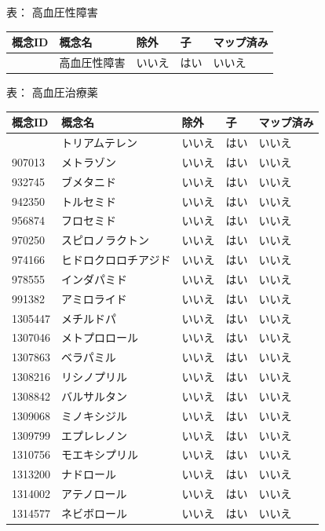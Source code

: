 \documentclass[
  11pt]{book}
\theoremstyle{definition}
\theoremstyle{definition}
\theoremstyle{definition}
\theoremstyle{definition}
\theoremstyle{remark}
\begin{document}
表：\label{tab:hypertensionThzMono} 高血圧性障害

\begin{longtable}[]{@{}lllll@{}}
\toprule\noalign{}
概念ID & 概念名 & 除外 & 子 & マップ済み \\
\midrule\noalign{}
\endhead
\bottomrule\noalign{}
\endlastfoot
316866 & 高血圧性障害 & いいえ & はい & いいえ \\
\end{longtable}

表：\label{tab:htnDrugsThzMono} 高血圧治療薬

\begin{longtable}[]{@{}lllll@{}}
\toprule\noalign{}
概念ID & 概念名 & 除外 & 子 & マップ済み \\
\midrule\noalign{}
\endhead
\bottomrule\noalign{}
\endlastfoot
904542 & トリアムテレン & いいえ & はい & いいえ \\
907013 & メトラゾン & いいえ & はい & いいえ \\
932745 & ブメタニド & いいえ & はい & いいえ \\
942350 & トルセミド & いいえ & はい & いいえ \\
956874 & フロセミド & いいえ & はい & いいえ \\
970250 & スピロノラクトン & いいえ & はい & いいえ \\
974166 & ヒドロクロロチアジド & いいえ & はい & いいえ \\
978555 & インダパミド & いいえ & はい & いいえ \\
991382 & アミロライド & いいえ & はい & いいえ \\
1305447 & メチルドパ & いいえ & はい & いいえ \\
1307046 & メトプロロール & いいえ & はい & いいえ \\
1307863 & ベラパミル & いいえ & はい & いいえ \\
1308216 & リシノプリル & いいえ & はい & いいえ \\
1308842 & バルサルタン & いいえ & はい & いいえ \\
1309068 & ミノキシジル & いいえ & はい & いいえ \\
1309799 & エプレレノン & いいえ & はい & いいえ \\
1310756 & モエキシプリル & いいえ & はい & いいえ \\
1313200 & ナドロール & いいえ & はい & いいえ \\
1314002 & アテノロール & いいえ & はい & いいえ \\
1314577 & ネビボロール & いいえ & はい & いいえ \\

\end{longtable}
\end{document}
